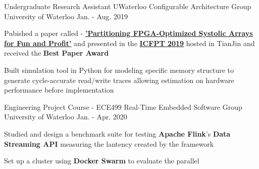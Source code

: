 


\begin{cventries}


\cventry
{Undergraduate Research Assistant} %
{UWaterloo Configurable Architecture Group} %
{University of Waterloo} %
{Jan. - Aug. 2019} %
{ %
\begin{cvitems}
\item {
    Pubished a paper called - 
    \textbf{
        \href{https://git.uwaterloo.ca/watcag-public/fpga-syspart}
        {'Partitioning FPGA-Optimized Systolic Arrays for Fun and Profit'}}
    and presented in the 
    \textbf{
        \href{http://fpt19.tju.edu.cn/Registration.htm}
        {ICFPT 2019}}
    hosted in TianJin and received the \textbf{Best Paper Award}
}
\item {
    Built simulation tool in Python for modeling specific memory 
    structure to generate cycle-accurate
    read/write traces allowing estimation on 
    hardware performance before implementation
}
\end{cvitems}
}


\cventry
{Engineering Project Course - ECE499} %
{Real-Time Embedded Software Group} %
{University of Waterloo} %
{Jan. - Apr. 2020} %
{ %
\begin{cvitems}
\item {
    Studied and design a benchmark suite for testing 
    \textbf{Apache Flink}'s \textbf{Data Streaming API}
    measuring the lantency created by the framework
}
\item {
    Set up a cluster using \textbf{Docker Swarm} to evaluate
    the parallel
}
\end{cvitems}
}

\end{cventries}